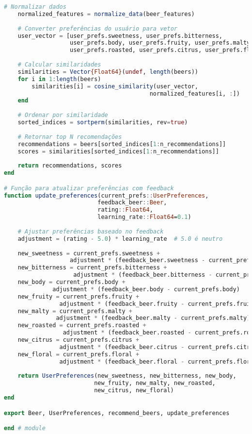 \documentclass[12pt,a4paper]{article}
\begin{document}
\begin{lstlisting}[language=Julia, caption=Código principal do sistema de recomendação]
    # Normalizar dados
    normalized_features = normalize_data(beer_features)
    
    # Converter preferências do usuário para vetor
    user_vector = [user_prefs.sweetness, user_prefs.bitterness,
                   user_prefs.body, user_prefs.fruity, user_prefs.malty,
                   user_prefs.roasted, user_prefs.citrus, user_prefs.floral]
    
    # Calcular similaridades
    similarities = Vector{Float64}(undef, length(beers))
    for i in 1:length(beers)
        similarities[i] = cosine_similarity(user_vector, 
                                          normalized_features[i, :])
    end
    
    # Ordenar por similaridade
    sorted_indices = sortperm(similarities, rev=true)
    
    # Retornar top N recomendações
    recommendations = beers[sorted_indices[1:n_recommendations]]
    scores = similarities[sorted_indices[1:n_recommendations]]
    
    return recommendations, scores
end

# Função para atualizar preferências com feedback
function update_preferences(current_prefs::UserPreferences,
                           feedback_beer::Beer,
                           rating::Float64,
                           learning_rate::Float64=0.1)
    
    # Ajustar preferências baseado no feedback
    adjustment = (rating - 5.0) * learning_rate  # 5.0 é neutro
    
    new_sweetness = current_prefs.sweetness + 
                   adjustment * (feedback_beer.sweetness - current_prefs.sweetness)
    new_bitterness = current_prefs.bitterness + 
                    adjustment * (feedback_beer.bitterness - current_prefs.bitterness)
    new_body = current_prefs.body + 
              adjustment * (feedback_beer.body - current_prefs.body)
    new_fruity = current_prefs.fruity + 
                adjustment * (feedback_beer.fruity - current_prefs.fruity)
    new_malty = current_prefs.malty + 
               adjustment * (feedback_beer.malty - current_prefs.malty)
    new_roasted = current_prefs.roasted + 
                 adjustment * (feedback_beer.roasted - current_prefs.roasted)
    new_citrus = current_prefs.citrus + 
                adjustment * (feedback_beer.citrus - current_prefs.citrus)
    new_floral = current_prefs.floral + 
                adjustment * (feedback_beer.floral - current_prefs.floral)
    
    return UserPreferences(new_sweetness, new_bitterness, new_body,
                          new_fruity, new_malty, new_roasted,
                          new_citrus, new_floral)
end

export Beer, UserPreferences, recommend_beers, update_preferences

end # module
\end{lstlisting}
\end{document}
